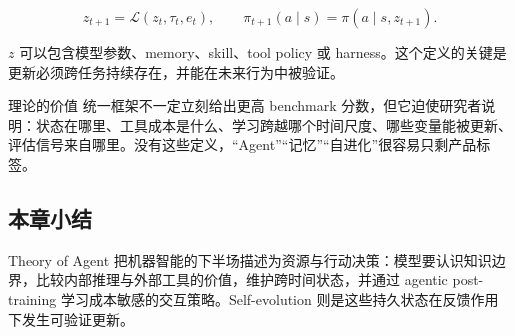 $$
z_{t+1}=\mathcal{L}(z_t,\tau_t,e_t),
\qquad
\pi_{t+1}(a\mid s)=\pi(a\mid s,z_{t+1}).
$$

$z$ 可以包含模型参数、memory、skill、tool policy 或 harness。这个定义的关键是更新必须跨任务持续存在，并能在未来行为中被验证。



\begin{knowledgebox}{理论的价值}
统一框架不一定立刻给出更高 benchmark 分数，但它迫使研究者说明：状态在哪里、工具成本是什么、学习跨越哪个时间尺度、哪些变量能被更新、评估信号来自哪里。没有这些定义，“Agent”“记忆”“自进化”很容易只剩产品标签。
\end{knowledgebox}

\subsection{本章小结}

Theory of Agent 把机器智能的下半场描述为资源与行动决策：模型要认识知识边界，比较内部推理与外部工具的价值，维护跨时间状态，并通过 agentic post-training 学习成本敏感的交互策略。Self-evolution 则是这些持久状态在反馈作用下发生可验证更新。
